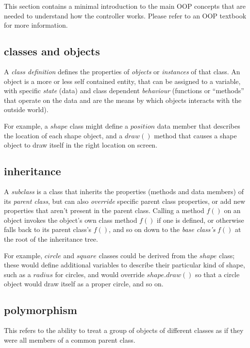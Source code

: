 \documentclass[12pt]{amsart}
\begin{document}
This section contains a minimal introduction to the main OOP concepts
that are needed to understand how the controller works.  Please refer to
an OOP textbook for more information.

\subsection{classes and objects}

A {\em class definition} defines the properties of {\em objects} or {\em
instances} of that class. An object is a more or less self contained
entity, that can be assigned to a variable, with specific {\em state}
(data) and class dependent {\em behaviour} (functions or ``methods''
that operate on the data and are the means by which objects interacts
with the outside world).    

For example, a $shape$ class might define a $position$ data member that
describes the location of each shape object, and a $draw()$ method that
causes a shape object to draw itself in the right location on screen.

\subsection{inheritance}

A {\em subclass} is a class that inherits the properties (methods and
data members) of its {\em parent class}, but can also {\em override}
specific parent class properties, or add new properties that aren't
present in the parent class. Calling a method $f()$ on an object invokes
the object's own class method $f()$ if one is defined, or otherwise
falls back to its parent class's $f()$, and so on down to the {\em
base class's} $f()$ at the root of the inheritance tree. 

For example, $circle$ and $square$ classes could be derived from the
$shape$ class; these would define additional variables to describe their
particular kind of shape, such as a $radius$ for circles, and would
override $shape.draw()$ so that a circle object would draw itself as a
proper circle, and so on.


\subsection{polymorphism}

This refers to the ability to treat a group of objects of different
classes as if they were all members of a common parent class.
\end{document}
